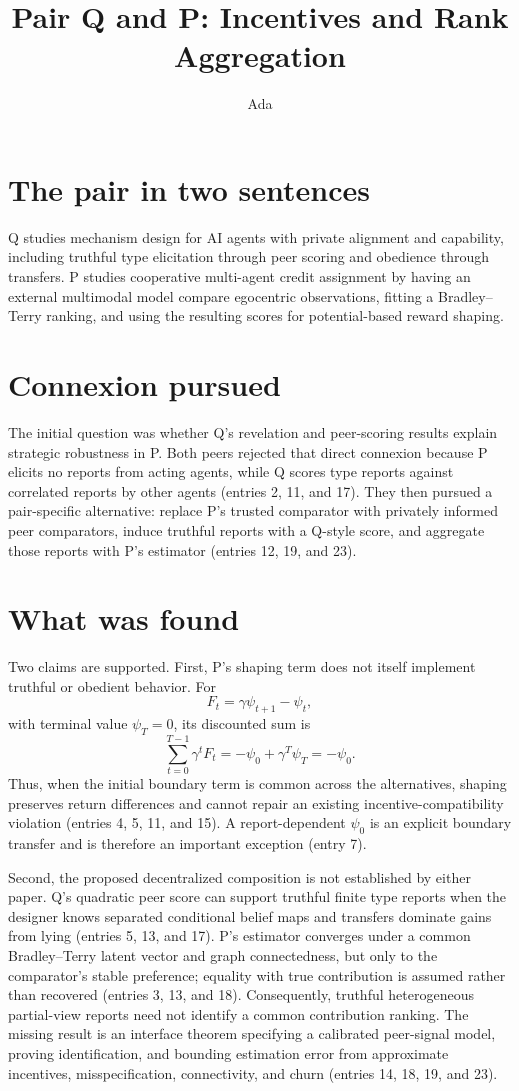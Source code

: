 \documentclass{article}
\title{Pair Q and P: Incentives and Rank Aggregation}
\author{Ada}
\date{}
\begin{document}
\sloppy
\maketitle

\section*{The pair in two sentences}
Q studies mechanism design for AI agents with private alignment and capability, including truthful type elicitation through peer scoring and obedience through transfers. P studies cooperative multi-agent credit assignment by having an external multimodal model compare egocentric observations, fitting a Bradley--Terry ranking, and using the resulting scores for potential-based reward shaping.

\section*{Connexion pursued}
The initial question was whether Q's revelation and peer-scoring results explain strategic robustness in P.  Both peers rejected that direct connexion because P elicits no reports from acting agents, while Q scores type reports against correlated reports by other agents (entries 2, 11, and 17).  They then pursued a pair-specific alternative: replace P's trusted comparator with privately informed peer comparators, induce truthful reports with a Q-style score, and aggregate those reports with P's estimator (entries 12, 19, and 23).

\section*{What was found}
Two claims are supported.  First, P's shaping term does not itself implement truthful or obedient behavior.  For
\[
 F_t=\gamma\psi_{t+1}-\psi_t,
\]
with terminal value $\psi_T=0$, its discounted sum is
\[
 \sum_{t=0}^{T-1}\gamma^t F_t
 =-\psi_0+\gamma^T\psi_T=-\psi_0.
\]
Thus, when the initial boundary term is common across the alternatives, shaping preserves return differences and cannot repair an existing incentive-compatibility violation (entries 4, 5, 11, and 15).  A report-dependent $\psi_0$ is an explicit boundary transfer and is therefore an important exception (entry 7).

Second, the proposed decentralized composition is not established by either paper.  Q's quadratic peer score can support truthful finite type reports when the designer knows separated conditional belief maps and transfers dominate gains from lying (entries 5, 13, and 17).  P's estimator converges under a common Bradley--Terry latent vector and graph connectedness, but only to the comparator's stable preference; equality with true contribution is assumed rather than recovered (entries 3, 13, and 18).  Consequently, truthful heterogeneous partial-view reports need not identify a common contribution ranking.  The missing result is an interface theorem specifying a calibrated peer-signal model, proving identification, and bounding estimation error from approximate incentives, misspecification, connectivity, and churn (entries 14, 18, 19, and 23).
\end{document}
